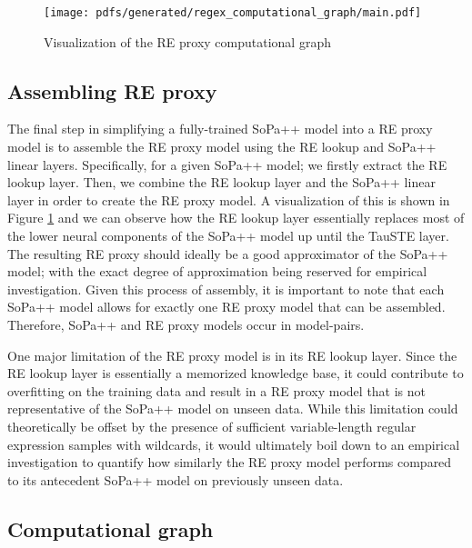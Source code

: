\begin{figure}[t!]
  \centering
  \texttt{[image: pdfs/generated/regex\_computational\_graph/main.pdf]}
  \caption{Visualization of the RE proxy computational graph}
  \label{fig:regex_cg}
\end{figure}

\subsection{Assembling RE proxy}

The final step in simplifying a fully-trained SoPa++ model into a RE proxy model
is to assemble the RE proxy model using the RE lookup and SoPa++ linear layers.
Specifically, for a given SoPa++ model; we firstly extract the RE lookup layer.
Then, we combine the RE lookup layer and the SoPa++ linear layer in order to
create the RE proxy model. A visualization of this is shown in Figure
\ref{fig:regex_cg} and we can observe how the RE lookup layer essentially
replaces most of the lower neural components of the SoPa++ model up until the
TauSTE layer. The resulting RE proxy should ideally be a good approximator of
the SoPa++ model; with the exact degree of approximation being reserved for
empirical investigation. Given this process of assembly, it is important to note
that each SoPa++ model allows for exactly one RE proxy model that can be
assembled. Therefore, SoPa++ and RE proxy models occur in model-pairs.

One major limitation of the RE proxy model is in its RE lookup layer. Since the
RE lookup layer is essentially a memorized knowledge base, it could contribute
to overfitting on the training data and result in a RE proxy model that is not
representative of the SoPa++ model on unseen data. While this limitation could
theoretically be offset by the presence of sufficient variable-length regular
expression samples with wildcards, it would ultimately boil down to an empirical
investigation to quantify how similarly the RE proxy model performs compared to
its antecedent SoPa++ model on previously unseen data.

\subsection{Computational graph}

\label{section:re_cg}

